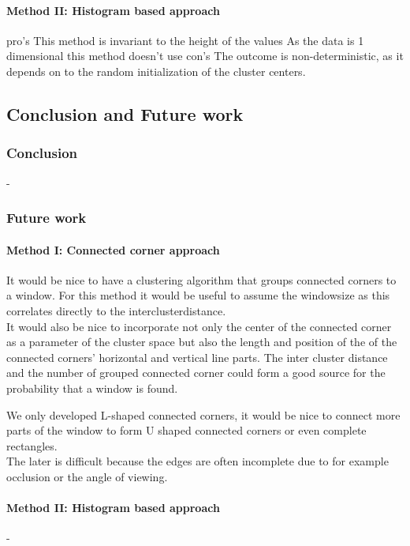 \paragraph{Method II: Histogram based approach} 
pro's 
This method is invariant to the height of the values
As the data is 1 dimensional this method doesn't use 
con's
The outcome is non-deterministic, as it depends on to the random initialization of the cluster centers.


\subsection{Conclusion and Future work}
\subsubsection{Conclusion}
-

\subsubsection{Future work}
\paragraph{Method I: Connected corner approach} 
It would be nice to have a clustering algorithm that groups connected corners to
a window. For this method it would be useful to assume the windowsize as this
correlates directly to the interclusterdistance.\\

It would also be nice to incorporate not only the center of the connected corner
as a parameter of the cluster space but also the length and position of the of
the connected corners' horizontal and vertical line parts.  The inter cluster
distance and the number of grouped connected corner could form a good source for
the probability that a window is found.

We only developed L-shaped connected corners, it would be nice to connect more
parts of the window to form U shaped connected corners or even complete rectangles.\\
The later is difficult because the edges are often incomplete due to for example occlusion 
or the angle of viewing.


\paragraph{Method II: Histogram based approach} 
- 





% 
% 
% 
% 
% 
% 
% 
% 
